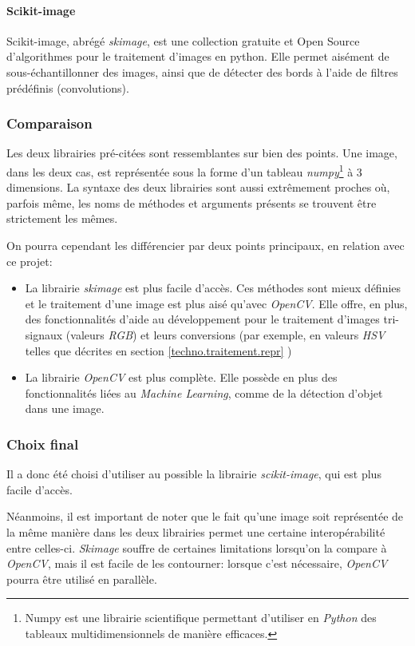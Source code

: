 \paragraph{Scikit-image}
Scikit-image\autocite{lib:skimage}, abrégé \textit{skimage}, est une collection gratuite et Open Source d'algorithmes pour le traitement d'images en python. Elle permet aisément de sous-échantillonner des images, ainsi que de détecter des bords à l'aide de filtres prédéfinis (convolutions).

\subsubsection{Comparaison}
Les deux librairies pré-citées sont ressemblantes sur bien des points. Une image, dans les deux cas, est représentée sous la forme d'un tableau \textit{numpy}\footnote{Numpy est une librairie scientifique permettant d'utiliser en \textit{Python} des tableaux multidimensionnels de manière efficaces.\autocite{lib:numpy}} à 3 dimensions. La syntaxe des deux librairies sont aussi extrêmement proches où, parfois même, les noms de méthodes et arguments présents se trouvent être strictement les mêmes.

On pourra cependant les différencier par deux points principaux, en relation avec ce projet:
\begin{itemize}
    \item La librairie \textit{skimage} est plus facile d'accès. Ces méthodes sont mieux définies et le traitement d'une image est plus aisé qu'avec \textit{OpenCV}. Elle offre, en plus, des fonctionnalités d'aide au développement pour le traitement d'images tri-signaux (valeurs \textit{RGB}) et leurs conversions (par exemple, en valeurs \textit{HSV} telles que décrites en section \ref{techno.traitement.repr} )
    \item La librairie \textit{OpenCV} est plus complète. Elle possède en plus des fonctionnalités liées au \textit{Machine Learning}, comme de la détection d'objet dans une image.
\end{itemize}

\subsubsection{Choix final}
Il a donc été choisi d'utiliser au possible la librairie \textit{scikit-image}, qui est plus facile d'accès. 

Néanmoins, il est important de noter que le fait qu'une image soit représentée de la même manière dans les deux librairies permet une certaine interopérabilité entre celles-ci. \textit{Skimage} souffre de certaines limitations lorsqu'on la compare à \textit{OpenCV}, mais il est facile de les contourner: lorsque c'est nécessaire, \textit{OpenCV} pourra être utilisé en parallèle.

